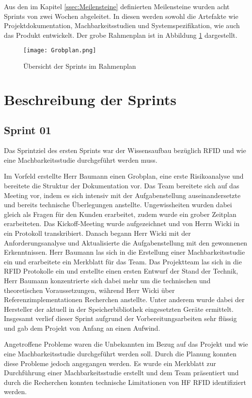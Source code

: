 Aus den im Kapitel \ref{ssec:Meilensteine} definierten Meilensteine wurden acht Sprints von zwei Wochen abgeleitet. In diesen werden sowohl die Artefakte wie Projektdokumentation, Machbarkeitsstudien und Systemspezifikation, wie auch das Produkt entwickelt. Der grobe Rahmenplan ist in Abbildung \ref{fig:Rahmenplan_1} dargestellt.

\begin{figure}[htb]
	\centering
	\texttt{[image: Grobplan.png]}
	\caption{Übersicht der Sprints im Rahmenplan}
	\label{fig:Rahmenplan_1}
\end{figure}

\section{Beschreibung der Sprints}

\subsection{Sprint 01}
Das Sprintziel des ersten Sprints war der Wissensaufbau bezüglich RFID und wie eine Machbarkeitsstudie durchgeführt werden muss.

Im Vorfeld erstellte Herr Baumann einen Grobplan, eine erste Risikoanalyse und bereitete die Struktur der Dokumentation vor. Das Team bereitete sich auf das Meeting vor, indem es sich intensiv mit der Aufgabenstellung auseinandersetzte und bereits technische Überlegungen anstellte. Ungewissheiten wurden dabei gleich als Fragen für den Kunden erarbeitet, zudem wurde ein grober Zeitplan erarbeiteten. Das Kickoff-Meeting wurde aufgezeichnet und von Herrn Wicki in ein Protokoll transkribiert. Danach begann Herr Wicki mit der Anforderungsanalyse und Aktualisierte die Aufgabenstellung mit den gewonnenen Erkenntnissen. Herr Baumann las sich in die Erstellung einer Machbarkeitsstudie ein und erarbeitete ein Merkblatt für das Team. Das Projektteam las sich in die RFID Protokolle ein und erstellte einen ersten Entwurf der Stand der Technik, Herr Baumann konzentrierte sich dabei mehr um die technischen und theoretischen Voraussetzungen, während Herr Wicki über Referenzimplementationen Recherchen anstellte. Unter anderem wurde dabei der Hersteller der aktuell in der Speicherbibliothek eingesetzten Geräte ermittelt. Insgesamt verlief dieser Sprint aufgrund der Vorbereitungsarbeiten sehr flüssig und gab dem Projekt von Anfang an einen Aufwind.

Angetroffene Probleme waren die Unbekannten im Bezug auf das Projekt und wie eine Machbarkeitsstudie durchgeführt werden soll. Durch die Planung konnten diese Probleme jedoch angegangen werden. Es wurde ein Merkblatt zur Durchführung einer Machbarkeitsstudie erstellt und dem Team präsentiert und durch die Recherchen konnten technische Limitationen von HF RFID identifiziert werden.

